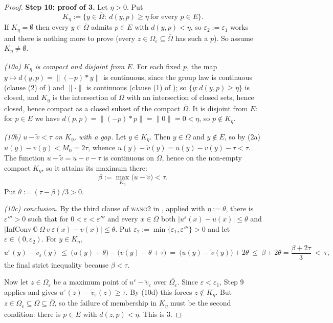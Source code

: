 \begin{proof}
\medskip\noindent\textbf{Step 10: proof of 3.} Let $\eta>0$. Put
\[
 K_\eta:=\big\{y\in\overline\Omega:\ d(y,p)\ge\eta\ \text{for every }p\in E\big\}.
\]
If $K_\eta=\emptyset$ then every $y\in\overline\Omega$ admits $p\in E$ with $d(y,p)<\eta$, so
$\varepsilon_2:=\varepsilon_1$ works and there is nothing more to prove (every
$z\in\Omega_\varepsilon\subseteq\overline\Omega$ has such a $p$). So assume
$K_\eta\neq\emptyset$.

\emph{(10a) $K_\eta$ is compact and disjoint from $E$.} For each fixed $p$, the map
$y\mapsto d(y,p)=\|(-p)*y\|$ is continuous, since the group law is continuous (clause (2) of
) and $\|\cdot\|$ is continuous (clause (1) of );
so $\{y:d(y,p)\ge\eta\}$ is closed, and $K_\eta$ is the intersection of $\overline\Omega$
with an intersection of closed sets, hence closed, hence compact as a closed subset of the
compact $\overline\Omega$. It is disjoint from $E$: for $p\in E$ we have
$d(p,p)=\|(-p)*p\|=\|0\|=0<\eta$, so $p\notin K_\eta$.

\emph{(10b) $u-\tilde v<\tau$ on $K_\eta$, with a gap.} Let $y\in K_\eta$. Then
$y\in\overline\Omega$ and $y\notin E$, so by (2a) $u(y)-v(y)<M_0=2\tau$, whence
$u(y)-\tilde v(y)=u(y)-v(y)-\tau<\tau$. The function $u-\tilde v=u-v-\tau$ is continuous on
$\overline\Omega$, hence on the non-empty compact $K_\eta$, so it attains its maximum there:
\[
 \beta:=\max_{K_\eta}\big(u-\tilde v\big)<\tau .
\]
Put $\theta:=(\tau-\beta)/3>0$.

\emph{(10c) conclusion.} By the third clause of \textsc{wang2} in ,
applied with $\eta:=\theta$, there is $\varepsilon'''>0$ such that for
$0<\varepsilon<\varepsilon'''$ and every $x\in\overline\Omega$ both
$|u^{\varepsilon}(x)-u(x)|\le\theta$ and
$|\mathrm{InfConv}\ \mathbb G\ \Omega\ v\ \varepsilon(x)-v(x)|\le\theta$. Put
$\varepsilon_2:=\min\{\varepsilon_1,\varepsilon'''\}>0$ and let
$\varepsilon\in(0,\varepsilon_2)$. For $y\in K_\eta$,
\[
 u^{\varepsilon}(y)-\tilde v_{\varepsilon}(y)
  \ \le\ \big(u(y)+\theta\big)-\big(v(y)-\theta+\tau\big)
  \ =\ \big(u(y)-\tilde v(y)\big)+2\theta
  \ \le\ \beta+2\theta=\frac{\beta+2\tau}{3}\ <\ \tau , \tag{10d}
\]
the final strict inequality because $\beta<\tau$.

Now let $z\in\Omega_\varepsilon$ be a maximum point of
$u^{\varepsilon}-\tilde v_{\varepsilon}$ over $\overline{\Omega_\varepsilon}$. Since
$\varepsilon<\varepsilon_1$, Step 9 applies and gives
$u^{\varepsilon}(z)-\tilde v_{\varepsilon}(z)\ge\tau$. By (10d) this forces
$z\notin K_\eta$. But $z\in\Omega_\varepsilon\subseteq\Omega\subseteq\overline\Omega$, so the
failure of membership in $K_\eta$ must be the second condition: there is $p\in E$ with
$d(z,p)<\eta$. This is 3.


\end{proof}
